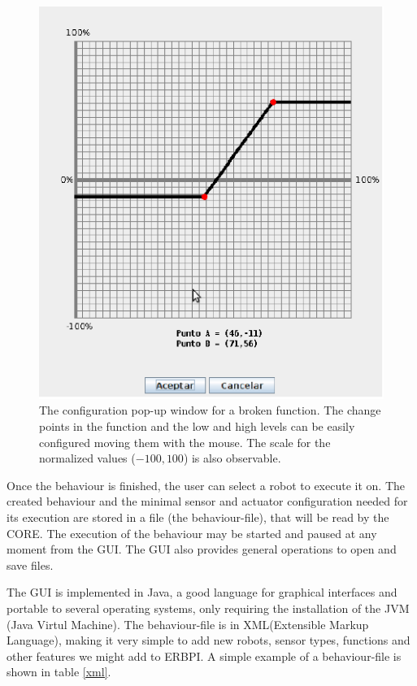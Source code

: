 \begin{figure}
 \centering
 \includegraphics[scale=0.3]{images/gui_function.png}
 \caption{The configuration pop-up window for a broken function. The change points in the function and the low and high levels can be easily configured moving them with the mouse. The scale for the normalized values ($-100, 100$) is also observable. }
 \label{Fig:guiFunction}
\end{figure}

Once the behaviour is finished, the user can select a robot to execute it on. The created behaviour and the minimal sensor and actuator configuration needed for its execution are stored in a file (the behaviour-file), that will be read by the CORE. The execution of the behaviour may be started and paused at any moment from the GUI. The GUI also provides general operations to open and save files. 

The GUI is implemented in Java, a good language for graphical interfaces and portable to several operating systems, only requiring the installation of the JVM (Java Virtul Machine). The behaviour-file is in XML(Extensible Markup Language), making it very simple to add new robots, sensor types, functions and other features we might add to ERBPI. A simple example of a behaviour-file is shown in table \ref{xml}. 


